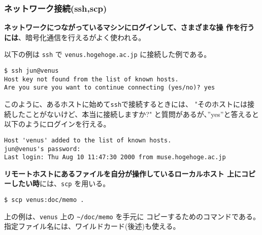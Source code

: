 \documentclass{jreport}
\begin{document}
\subsubsection{ネットワーク接続(ssh,scp)}
\label{sec:ssh}

\textbf{ネットワークにつながっているマシンにログインして、さまざまな操
  作を行うには}、暗号化通信を行えるがよく使われる。

以下の例は \verb|ssh| で \verb|venus.hogehoge.ac.jp| に接続した例である。
\begin{screen}
\begin{verbatim}
$ ssh jun@venus
Host key not found from the list of known hosts.
Are you sure you want to continue connecting (yes/no)? yes
\end{verbatim}
\end{screen}
このように、あるホストに始めて\verb|ssh|で接続するときには、
"そのホストには接続したことがないけど、本当に接続しますか?"
と質問があるが、''yes''と答えると以下のようにログインを行える。
\begin{screen}
\begin{verbatim}
Host 'venus' added to the list of known hosts.
jun@venus's password:
Last login: Thu Aug 10 11:47:30 2000 from muse.hogehoge.ac.jp
\end{verbatim}
\end{screen}

\textbf{リモートホストにあるファイルを自分が操作しているローカルホスト
  上にコピーしたい時}には、\verb|scp| を用いる。
\begin{screen}
\begin{verbatim}
$ scp venus:doc/memo .
\end{verbatim}
\end{screen}
上の例は、\verb|venus| 上の \verb|~/doc/memo| を手元に
コピーするためのコマンドである。指定ファイル名には、ワイルドカード(後述)も使える。

\end{document}
